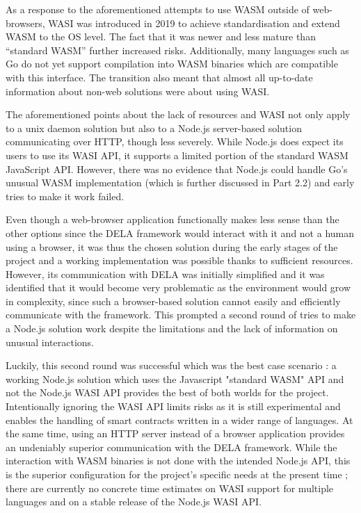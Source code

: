 \documentclass[11pt, a4paper, twoside, openright]{article}
\begin{document}
As a response to the aforementioned attempts to use WASM outside of web-browsers, WASI was introduced in 2019 to achieve standardisation and extend WASM to the OS level. The fact that it was newer and less mature than ``standard WASM'' further increased risks. Additionally, many languages such as Go do not yet support compilation into WASM binaries which are compatible with this interface. The transition also meant that almost all up-to-date information about non-web solutions were about using WASI.

The aforementioned points about the lack of resources and WASI not only apply to a unix daemon solution but also to a Node.js server-based solution communicating over HTTP, though less severely. While Node.js does expect its users to use its WASI API, it supports a limited portion of the standard WASM JavaScript API. However, there was no evidence that Node.js could handle Go's unusual WASM implementation (which is further discussed in Part 2.2) and early tries to make it work failed.

Even though a web-browser application functionally makes less sense than the other options since the DELA framework would interact with it and not a human using a browser, it was thus the chosen solution during the early stages of the project and a working implementation was possible thanks to sufficient resources. However, its communication with DELA was initially simplified and it was identified that it would become very problematic as the environment would grow in complexity, since such a browser-based solution cannot easily and efficiently communicate with the framework. This prompted a second round of tries to make a Node.js solution work despite the limitations and the lack of information on unusual interactions.

Luckily, this second round was successful which was the best case scenario : a working Node.js solution which uses the Javascript "standard WASM" API and not the Node.js WASI API provides the best of both worlds for the project. Intentionally ignoring the WASI API limits risks as it is still experimental and enables the handling of smart contracts written in a wider range of languages. At the same time, using an HTTP server instead of a browser application provides an undeniably superior communication with the DELA framework. While the interaction with WASM binaries is not done with the intended Node.js API, this is the superior configuration for the project's specific needs at the present time ; there are currently no concrete time estimates on WASI support for multiple languages and on a stable release of the Node.js WASI API.
\end{document}
